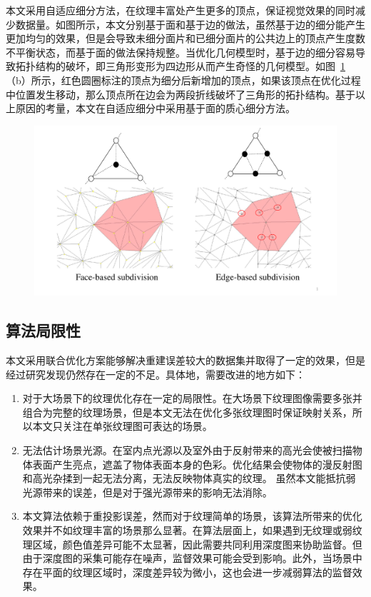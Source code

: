 本文采用自适应细分方法，在纹理丰富处产生更多的顶点，保证视觉效果的同时减少数据量。如图所示，本文分别基于面和基于边的做法，虽然基于边的细分能产生更加均匀的效果，但是会导致未细分面片和已细分面片的公共边上的顶点产生度数不平衡状态，而基于面的做法保持规整。当优化几何模型时，基于边的细分容易导致拓扑结构的破坏，即三角形变形为四边形从而产生奇怪的几何模型。如图~\ref{fig:Triangles}（b）所示，红色圆圈标注的顶点为细分后新增加的顶点，如果该顶点在优化过程中位置发生移动，那么顶点所在边会为两段折线破坏了三角形的拓扑结构。基于以上原因的考量，本文在自适应细分中采用基于面的质心细分方法。
\begin{figure}[ht]
\centering
\includegraphics[width=1\linewidth]{pic/work2/Tri.pdf}
\label{fig:Triangles}
\end{figure}
\subsection{算法局限性}
本文采用联合优化方案能够解决重建误差较大的数据集并取得了一定的效果，但是经过研究发现仍然存在一定的不足。具体地，需要改进的地方如下：\par
\begin{enumerate}
	\item 对于大场景下的纹理优化存在一定的局限性。在大场景下纹理图像需要多张并组合为完整的纹理场景，但是本文无法在优化多张纹理图时保证映射关系，所以本文只关注在单张纹理图可表达的场景。
	\item 无法估计场景光源。在室内点光源以及室外由于反射带来的高光会使被扫描物体表面产生亮点，遮盖了物体表面本身的色彩。优化结果会使物体的漫反射图和高光杂揉到一起无法分离，无法反映物体真实的纹理。 虽然本文能抵抗弱光源带来的误差，但是对于强光源带来的影响无法消除。
	\item 本文算法依赖于重投影误差，然而对于纹理简单的场景，该算法所带来的优化效果并不如纹理丰富的场景那么显著。在算法层面上，如果遇到无纹理或弱纹理区域，颜色值差异可能不太显著，因此需要共同利用深度图来协助监督。但由于深度图的采集可能存在噪声，监督效果可能会受到影响。此外，当场景中存在平面的纹理区域时，深度差异较为微小，这也会进一步减弱算法的监督效果。
\end{enumerate}


